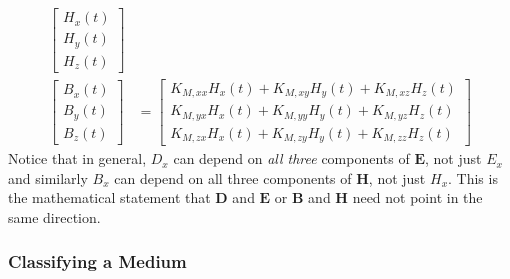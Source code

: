 \begin{itemize}
\begin{align*}
\begin{bmatrix}
        H_x(t) \\
        H_y(t) \\
        H_z(t)
      \end{bmatrix} \\
        \begin{bmatrix}
        B_x(t) \\
        B_y(t) \\
        B_z(t)
      \end{bmatrix}
      &=
      \begin{bmatrix}
        K_{M,xx} H_x(t) + K_{M,xy} H_y(t) + K_{M,xz} H_z(t) \\
        K_{M,yx} H_x(t) + K_{M,yy} H_y(t) + K_{M,yz} H_z(t) \\
        K_{M,zx} H_x(t) + K_{M,zy} H_y(t) + K_{M,zz} H_z(t)
      \end{bmatrix}
    \end{align*}
    Notice that in general, \( D_x \) can depend on \emph{all three} components of
    \( \mathbf{E} \), not just \( E_x \) and similarly \( B_x \) can depend on all three
    components of \( \mathbf{H} \), not just \( H_x \). This is the mathematical statement
    that \( \mathbf{D} \) and \( \mathbf{E} \) or \( \mathbf{B} \) and \( \mathbf{H} \)
    need not point in the same direction.
\end{itemize}

\subsubsection{Classifying a Medium}

